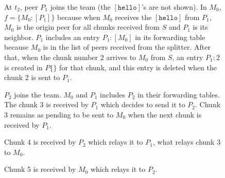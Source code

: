 \begin{figure}
   \caption{At $t_2$, peer $P_1$ joins
    the team (the $[\mathtt{hello}]$'s are not shown). In $M_0$,
    $f=\{M_0:[P_1]\}$ because when $M_0$ receives the
    $[\mathtt{hello}]$ from $P_1$, $M_0$ is the origin peer for all
    chunks received from $S$ and $P_1$ is its neighbor. $P_1$ includes
    an entry $P_1:[M_0]$ in its forwarding table because $M_0$ is in
    the list of peers received from the splitter. After that, when the
    chunk number 2 arrives to $M_0$ from $S$, an entry $P_1:2$ is
    created in $P\{\}$ for that chunk, and this entry is deleted when
    the chunk 2 is sent to $P_1$.\label{fig:team_1}}
\end{figure}

\begin{figure}
   \caption{$P_2$ joins the team. $M_0$
    and $P_1$ includes $P_2$ in their forwarding tables. The chunk 3
    is received by $P_1$ which decides to send it to $P_2$. Chunk 3
    remains as pending to be sent to $M_0$ when the next chunk is
    received by $P_1$. \label{fig:team_2}}
\end{figure}
    
\begin{figure}
   \caption{Chunk 4 is received by $P_2$ which
    relays it to $P_1$, what relays chunk 3 to
    $M_0$.\label{fig:team_3}}
\end{figure}

\begin{figure}
   \caption{Chunk 5 is received by $M_0$ which
    relays it to $P_2$.\label{fig:team_4}}
\end{figure}

